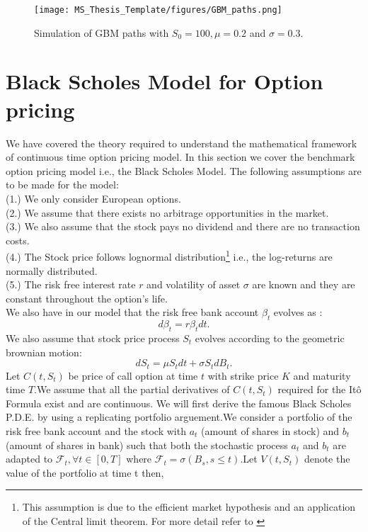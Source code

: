 \documentclass[12pt]{report}
\begin{document}
\begin{figure}[H]
    \centering
    \texttt{[image: MS\_Thesis\_Template/figures/GBM\_paths.png]}
    \caption{Simulation of GBM paths with $S_0 =100,\mu = 0.2$ and $\sigma = 0.3.$}
\label{gbm_paths}    
\end{figure}


\section{Black Scholes Model for Option pricing}
We have covered the theory required to understand the mathematical framework of continuous time option pricing model. In this section we cover the benchmark option pricing model i.e., the Black Scholes Model. The following assumptions are to be made for the model:\\
(1.) We only consider European options.\\
(2.) We assume that there exists no arbitrage opportunities in the market.\\ 
(3.) We also assume that the stock pays no dividend and there are no transaction costs.\\
(4.) The Stock price follows lognormal distribution\footnote{This assumption is due to the efficient market hypothesis and an application of the Central limit theorem. For more detail refer to \cite{rosenkrantz_2009}} i.e., the log-returns are normally distributed.\\
(5.) The risk free interest rate $r$ and volatility of asset $\sigma$ are known and they are constant throughout the option's life.\\
We also have in our model that the risk free bank account $\beta_t$ evolves as :\\
\begin{equation}
    d\beta_t = r\beta_t dt.
\end{equation}
We also assume that stock price process $S_t$ evolves according to the geometric brownian motion:\\
\begin{equation}
    dS_t = \mu S_{t}dt + \sigma S_{t}dB_t.
\end{equation}
Let $C(t,S_t)$ be price of call option at time $t$ with strike price $K$ and maturity time $T$.We assume that all the partial derivatives of $C(t,S_t)$ required for the Itô Formula exist and are continuous. We will first derive the famous Black Scholes P.D.E. by using a replicating portfolio arguement.We consider a portfolio of the risk free bank account and the stock with $a_t$ (amount of shares in stock) and $b_t$(amount of shares in bank) such that both the stochastic process $a_t$ and $b_t$ are adapted to $\mathcal{F}_t, \forall t \in [0,T]$ where $\mathcal{F}_t = \sigma(B_s,s \leq t)$.Let $V(t,S_t)$ denote the value of the portfolio at time t then,\\
\end{document}
